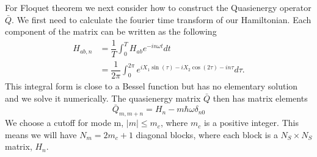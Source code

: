 \documentclass[aps,prl,showpacs,twocolumn,amsmath,amssymb,superscriptaddress]{revtex4-2}
\begin{document}
For Floquet theorem we next consider how to construct the Quasienergy operator $\bar{Q}$.
We first need to calculate the fourier time transform of our Hamiltonian.
Each component of the matrix can be written as the following
\begin{align}
  H_{ab, n} &= \dfrac{1}{T} \int^T_0 H_{ab} e^{-i n \omega t} dt \nonumber \\
  &= \dfrac{1}{2\pi} \int^{2\pi}_0 e^{iX_1\sin(\tau) - iX_2\cos(2\tau) - i n \tau} d\tau.
\end{align}
This integral form is close to a Bessel function but has no elementary solution and we solve it numerically.
The quasienergy matrix $\bar{Q}$ then has matrix elements
\begin{equation}
  \bar{Q}_{m,m+n} = H_n - m \hbar \omega \delta_{n0}
\end{equation}
We choose a cutoff for mode m, $|m| \leq m_c$, where $m_c$ is a positive integer.
This means we will have $N_m = 2 m_c +1$ diagonal blocks, where each block is a $N_S \times N_S$ matrix, $H_n$.
\end{document}
